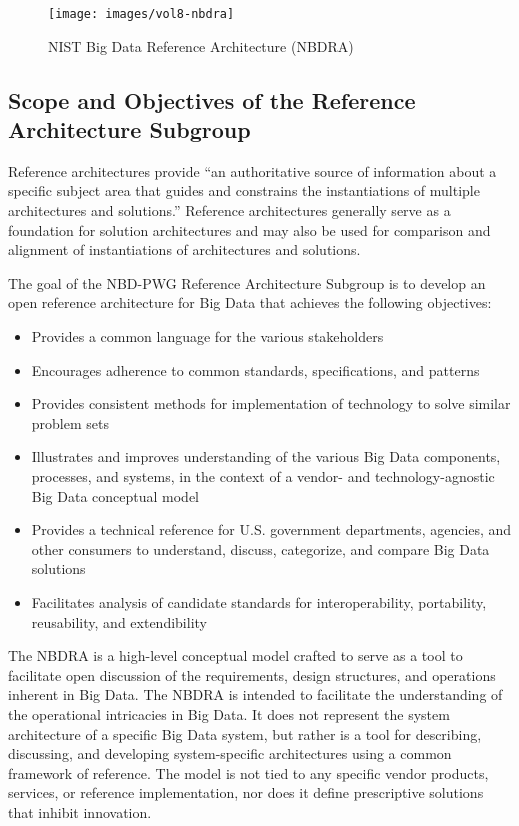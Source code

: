 \documentclass[10pt]{article}
\begin{document}
\begin{figure}[h]\centering
\texttt{[image: images/vol8-nbdra]}
\caption{NIST Big Data Reference Architecture (NBDRA)}
\label{F:architecture}
\end{figure}


\subsection{Scope and Objectives of the Reference Architecture
  Subgroup}

Reference architectures provide “an authoritative source of information about a specific subject area that guides and constrains the instantiations of multiple architectures and solutions.”   Reference architectures generally serve as a foundation for solution architectures and may also be used for comparison and alignment of instantiations of architectures and solutions. 
 
The goal of the NBD-PWG Reference Architecture Subgroup is to develop an open reference architecture for Big Data that achieves the following objectives:

 \begin{itemize}
\item Provides a common language for the various stakeholders
\item Encourages adherence to common standards, specifications, and patterns
\item Provides consistent methods for implementation of technology to solve similar problem sets
\item Illustrates and improves understanding of the various Big Data components, processes, and systems, in the context of a vendor- and technology-agnostic Big Data conceptual model
\item Provides a technical reference for U.S. government departments, agencies, and other consumers to understand, discuss, categorize, and compare Big Data solutions
\item Facilitates analysis of candidate standards for interoperability, portability, reusability, and extendibility
 \end{itemize}

The NBDRA is a high-level conceptual model crafted to serve as a tool to facilitate open discussion of the requirements, design structures, and operations inherent in Big Data. The NBDRA is intended to facilitate the understanding of the operational intricacies in Big Data. It does not represent the system architecture of a specific Big Data system, but rather is a tool for describing, discussing, and developing system-specific architectures using a common framework of reference. The model is not tied to any specific vendor products, services, or reference implementation, nor does it define prescriptive solutions that inhibit innovation. 
\end{document}
